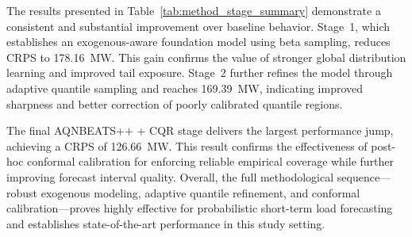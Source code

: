 The results presented in Table~\ref{tab:method_stage_summary} demonstrate a
consistent and substantial improvement over baseline behavior. Stage~1,
which establishes an exogenous-aware foundation model using beta sampling,
reduces CRPS to 178.16~MW. This gain confirms the value of stronger global
distribution learning and improved tail exposure. Stage~2 further refines
the model through adaptive quantile sampling and reaches 169.39~MW,
indicating improved sharpness and better correction of poorly calibrated
quantile regions.

The final AQNBEATS++ + CQR stage delivers the largest performance jump,
achieving a CRPS of 126.66~MW. This result confirms the effectiveness of
post-hoc conformal calibration for enforcing reliable empirical coverage
while further improving forecast interval quality. Overall, the full
methodological sequence---robust exogenous modeling, adaptive quantile
refinement, and conformal calibration---proves highly effective for
probabilistic short-term load forecasting and establishes state-of-the-art
performance in this study setting.

